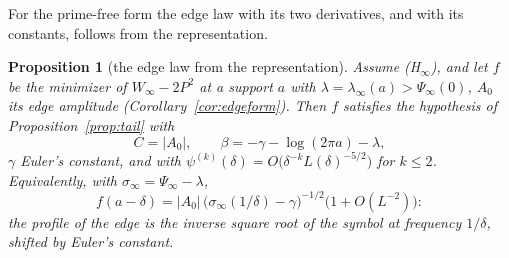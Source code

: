\documentclass[11pt]{article}
\newtheorem{proposition}[theorem]{Proposition}
\theoremstyle{definition}
\theoremstyle{remark}
\begin{document}
For the prime-free form the edge law with its two derivatives, and with its constants, follows from the representation.

\begin{proposition}[the edge law from the representation]\label{prop:profile}
Assume (H$_\infty$), and let $f$ be the minimizer of $W_\infty-2P^2$ at a support $a$ with $\lambda=\lambda_\infty(a)>\Psi_\infty(0)$, $A_0$ its edge amplitude (Corollary~\ref{cor:edgeform}). Then $f$ satisfies the hypothesis of Proposition~\ref{prop:tail} with
\[
C=|A_0|,\qquad \beta=-\gamma-\log(2\pi a)-\lambda ,
\]
$\gamma$ Euler's constant, and with $\psi^{(k)}(\delta)=O\big(\delta^{-k}L(\delta)^{-5/2}\big)$ for $k\le2$. Equivalently, with $\sigma_\infty=\Psi_\infty-\lambda$,
\[
f(a-\delta)=|A_0|\,\big(\sigma_\infty(1/\delta)-\gamma\big)^{-1/2}\big(1+O(L^{-2})\big):
\]
the profile of the edge is the inverse square root of the symbol at frequency $1/\delta$, shifted by Euler's constant.
\end{proposition}
\end{document}
